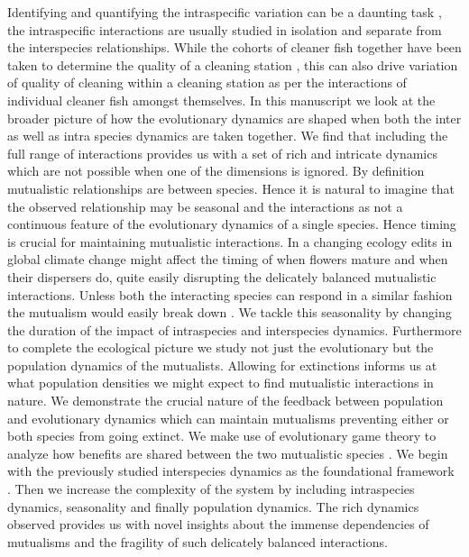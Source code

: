 \documentclass{pnastwo}
\begin{document}
\begin{article}
Identifying and quantifying the intraspecific variation can be a daunting task \cite{behm:JE:2014}, the intraspecific interactions are usually studied in isolation and separate from the interspecies relationships. 
While the cohorts of cleaner fish together have been taken to determine the quality of a cleaning station \cite{bshary:AB:2002,bshary:book:2003}, this can also drive variation of quality of cleaning within a cleaning station as per the interactions of individual cleaner fish amongst themselves.
In this manuscript we look at the broader picture of how the evolutionary dynamics are shaped when both the inter as well as intra species dynamics are taken together.
We find that including the full range of interactions provides us with a set of rich and intricate dynamics which are not possible when one of the dimensions is ignored.
By definition mutualistic relationships are between species.
Hence it is natural to imagine that the observed relationship may be seasonal and the interactions as not a continuous feature of the evolutionary dynamics of a single species.
Hence timing is crucial for maintaining mutualistic interactions.
In a changing ecology edits in global climate change might affect the timing of when flowers mature and when their dispersers do, quite easily disrupting the delicately balanced mutualistic interactions.
Unless both the interacting species can respond in a similar fashion the mutualism would easily break down \cite{warren:GCB:2014}.
We tackle this seasonality by changing the duration of the impact of intraspecies and interspecies dynamics.
Furthermore to complete the ecological picture we study not just the evolutionary but the population dynamics of the mutualists.
Allowing for extinctions informs us at what population densities we might expect to find mutualistic interactions in nature.
We demonstrate the crucial nature of the feedback between population and evolutionary dynamics which can maintain mutualisms preventing either or both species from going extinct. 
We make use of evolutionary game theory to analyze how benefits are shared between the two mutualistic species
\cite{weibull:book:1995,hofbauer:JMB:1996,hofbauer:book:1998}.
We begin with the previously studied interspecies dynamics as the foundational framework \cite{gokhale:PRSB:2012}.
Then we increase the complexity of the system by including intraspecies dynamics, seasonality and finally population dynamics.
The rich dynamics observed provides us with novel insights about the immense dependencies of mutualisms and the fragility of such delicately balanced interactions.


\end{article}
\end{document}
